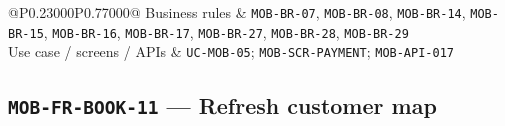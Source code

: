 \begin{longtable}{@{}P{0.23000\SRSWidth}P{0.77000\SRSWidth}@{}}
Business rules & \texttt{MOB-\allowbreak{}BR-\allowbreak{}07}, \texttt{MOB-\allowbreak{}BR-\allowbreak{}08}, \texttt{MOB-\allowbreak{}BR-\allowbreak{}14}, \texttt{MOB-\allowbreak{}BR-\allowbreak{}15}, \texttt{MOB-\allowbreak{}BR-\allowbreak{}16}, \texttt{MOB-\allowbreak{}BR-\allowbreak{}17}, \texttt{MOB-\allowbreak{}BR-\allowbreak{}27}, \texttt{MOB-\allowbreak{}BR-\allowbreak{}28}, \texttt{MOB-\allowbreak{}BR-\allowbreak{}29} \\[3pt]
Use case /\allowbreak{} screens /\allowbreak{} APIs & \texttt{UC-\allowbreak{}MOB-\allowbreak{}05}; \texttt{MOB-\allowbreak{}SCR-\allowbreak{}PAYMENT}; \texttt{MOB-\allowbreak{}API-\allowbreak{}017} \\[3pt]
\end{longtable}
\endgroup

\subsection{\texttt{MOB-\allowbreak{}FR-\allowbreak{}BOOK-\allowbreak{}11} — Refresh customer map}
\begingroup
\fontsize{9.5}{12}\selectfont
\setlength{\SRSWidth}{\dimexpr\linewidth-2\tabcolsep\relax}
